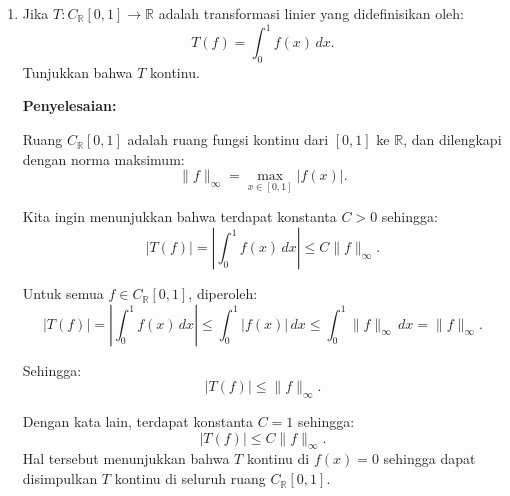 \documentclass{article}
\theoremstyle{definition}
\begin{document}
\pagestyle{fancy}

\begin{enumerate}
  \item Jika $T: C_{\mathbb{R}}[0,1] \to \mathbb{R}$ adalah transformasi linier yang didefinisikan oleh:
  \[
   T(f) = \int_0^1 f(x) \, dx.
  \]
  Tunjukkan bahwa $T$ kontinu.
  
  \bigskip
  
  \textbf{Penyelesaian:}
  
  Ruang $C_{\mathbb{R}}[0,1]$ adalah ruang fungsi kontinu dari $[0,1]$ ke $\mathbb{R}$, dan dilengkapi dengan norma maksimum:
  \[
  \|f\|_\infty = \max_{x \in [0,1]} |f(x)|.
  \]
  
  Kita ingin menunjukkan bahwa terdapat konstanta $C > 0$ sehingga:
  \[
  |T(f)| = \left| \int_0^1 f(x) \, dx \right| \leq C \|f\|_\infty.
  \]
  
  Untuk semua $f \in C_{\mathbb{R}}[0,1]$, diperoleh:
  \[
  \left| T(f) \right| = \left| \int_0^1 f(x) \, dx \right| 
  \leq \int_0^1 |f(x)| \, dx 
  \leq \int_0^1 \|f\|_\infty \, dx 
  = \|f\|_\infty.
  \]
  
  Sehingga:
  \[
  |T(f)| \leq \|f\|_\infty.
  \]
  
  Dengan kata lain, terdapat konstanta $C = 1$ sehingga:
  \[
  |T(f)| \leq C \|f\|_\infty.
  \]
  Hal tersebut menunjukkan bahwa $T$ kontinu di $f(x)=0$ sehingga dapat disimpulkan $T$ kontinu di seluruh ruang $C_{\mathbb{R}}[0,1]$.
\end{enumerate}
\end{document}

